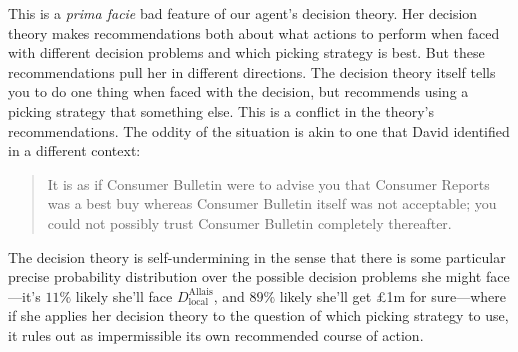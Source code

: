 \documentclass[a4paper]{article}
\newenvironment{CCM rewritten}
{\begingroup\color{blue}} %
{\endgroup}              %
\begin{document}
This is a \emph{prima facie} bad feature of our agent's decision theory. Her decision theory makes recommendations both about what actions to perform when faced with different decision problems and which picking strategy is best. But these recommendations pull her in different directions. The decision theory itself tells you to do one thing when faced with the decision, but recommends using a picking strategy that something else. 
This is a conflict in the theory's recommendations. The oddity of the situation is akin to one that David \citet[56]{lewis1971iim} identified in a different context:
\begin{quote}
	It is as if Consumer Bulletin were to advise you that Consumer Reports was a best
	buy whereas Consumer Bulletin itself was not acceptable; you could not possibly
	trust Consumer Bulletin completely thereafter.
\end{quote}

The decision theory is self-undermining in the sense that there is some particular precise probability distribution over the possible decision problems she might face---it's $11\%$ likely she'll face $D^{\mathrm{Allais}}_{\mathrm{local}}$, and $89\%$ likely she'll get \pounds 1m for sure---where if she applies her decision theory to the question of which picking strategy to use, it rules out as impermissible its own recommended course of action. 
\end{document}
